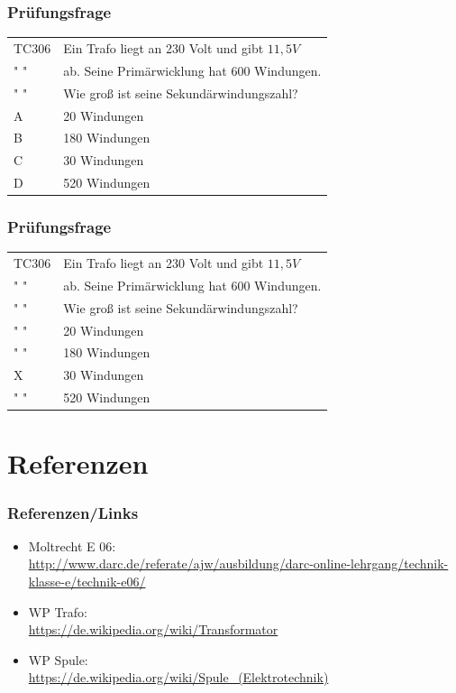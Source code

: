 \begin{frame}
    \frametitle{Prüfungsfrage}
    
    \begin{center}
    \begin{tabular}{l||l}\hline
        TC306 & Ein Trafo liegt an 230 Volt und gibt $11,5V$\\
        " "  & ab. Seine Primärwicklung hat 600 Windungen. \\ 
         " "  & Wie groß ist seine Sekundärwindungszahl?\\\hline\hline
        A & 20 Windungen\\ \hline
    	B & 180 Windungen \\ \hline
        C &  30 Windungen \\ \hline
        D & 520 Windungen \\ \hline
    \end{tabular}
 	    \end{center}
\end{frame}

\begin{frame}
    \frametitle{Prüfungsfrage}
    
    \begin{center}
    \begin{tabular}{l||l}\hline
        TC306 & Ein Trafo liegt an 230 Volt und gibt $11,5V$\\
        " "  & ab. Seine Primärwicklung hat 600 Windungen. \\ 
         " "  & Wie groß ist seine Sekundärwindungszahl?\\\hline\hline
        " " & 20 Windungen\\ \hline
    	" " & 180 Windungen \\ \hline
        X &  30 Windungen \\ \hline
        " " & 520 Windungen \\ \hline
    \end{tabular}
 	    \end{center}
\end{frame}

\section*{Referenzen}

\begin{frame}
    \frametitle{Referenzen/Links}
    
    \footnotesize
    \begin{itemize}
        \item Moltrecht E 06: \\
              \url{http://www.darc.de/referate/ajw/ausbildung/darc-online-lehrgang/technik-klasse-e/technik-e06/}
         \item WP Trafo: \\
              \url{https://de.wikipedia.org/wiki/Transformator}
 		\item WP Spule: \\
              \url{https://de.wikipedia.org/wiki/Spule_(Elektrotechnik)}
    \end{itemize}

\end{frame}


